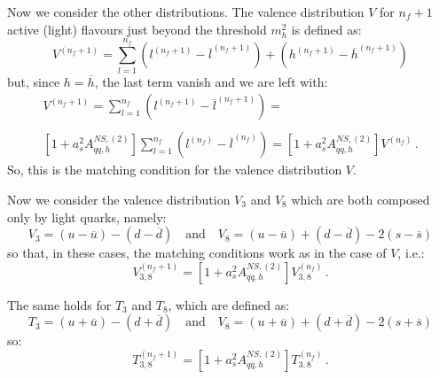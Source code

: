 \documentclass[10pt,a4paper]{article}
\begin{document}
Now we consider the other distributions. The valence distribution $V$
for $n_f+1$ active (light) flavours just beyond the threshold $m_h^2$
is defined as:
\begin{equation}
V^{(n_f+1)}=\sum_{l=1}^{n_f}(l^{(n_f+1)}-\overline{l}^{(n_f+1)})+(h^{(n_f+1)}-\overline{h}^{(n_f+1)})
\end{equation}
but, since $h=\overline{h}$, the last term vanish and we are left with:
\begin{equation}\label{valence}
\begin{array}{c}
\displaystyle V^{(n_f+1)}=\sum_{l=1}^{n_f}(l^{(n_f+1)}-\overline{l}^{(n_f+1)})=\\
\\
\displaystyle [1+a_s^2A_{qq,h}^{N\!S,(2)}]\sum_{l=1}^{n_f}(l^{(n_f)}-\overline{l}^{(n_f)})=[1+a_s^2A_{qq,h}^{N\!S,(2)}]V^{(n_f)}\,.
\end{array}
\end{equation}
So, this is the matching condition for the valence distribution $V$.

Now we consider the valence distribution $V_3$ and $V_8$ which are
both composed only by light quarks, namely:
\begin{equation}
V_3=(u-\overline{u})-(d-\overline{d})\quad\mbox{and}\quad V_8=(u-\overline{u})+(d-\overline{d})-2(s-\overline{s})
\end{equation}
so that, in these cases, the matching conditions work as in the case
of $V$, i.e.:
\begin{equation}\label{v38}
V_{3,8}^{(n_f+1)}=[1+a_s^2A_{qq,h}^{N\!S,(2)}]V^{(n_f)}_{3,8}\,.
\end{equation}

The same holds for $T_{3}$ and $T_8$, which are defined as:
\begin{equation}
T_3=(u+\overline{u})-(d+\overline{d})\quad\mbox{and}\quad V_8=(u+\overline{u})+(d+\overline{d})-2(s+\overline{s})
\end{equation}
so:
\begin{equation}\label{t38}
T_{3,8}^{(n_f+1)}=[1+a_s^2A_{qq,h}^{N\!S,(2)}]T^{(n_f)}_{3,8}\,.
\end{equation}
\end{document}
